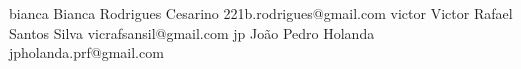     {bianca}
    {Bianca Rodrigues Cesarino}
    {221b.rodrigues@gmail.com}
    {victor}
    {Victor Rafael Santos Silva}
    {vicrafsansil@gmail.com}
    {jp}
    {João Pedro Holanda}
    {jpholanda.prf@gmail.com}
